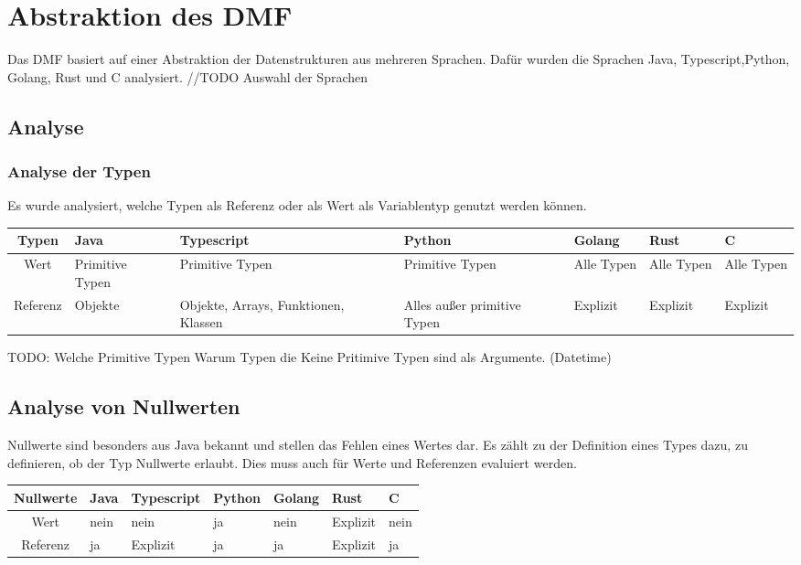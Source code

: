 \documentclass[./einleitung.tex]{subfiles}
\begin{document}
\section{Abstraktion des DMF}
Das DMF basiert auf einer Abstraktion der Datenstrukturen aus mehreren Sprachen.
Dafür wurden die Sprachen Java, Typescript,Python, Golang, Rust und C analysiert.
//TODO Auswahl der Sprachen
\subsection{Analyse}
\subsubsection{Analyse der Typen}
Es wurde analysiert, welche Typen als Referenz oder als Wert als Variablentyp genutzt werden können.
\begin{center}
\begin{tabular}{| c || m{4em} | m{5em} | m{5em} | m{4.5em} | m{4.5em} | m{4.5em} |}
\hline
Typen & Java & Typescript & Python & Golang & Rust & C \\
\hline
Wert & Primitive Typen & Primitive Typen & Primitive Typen & Alle Typen & Alle Typen & Alle Typen \\
\hline
Referenz & Objekte & Objekte, Arrays, Funktionen, Klassen & Alles außer primitive Typen & Explizit & Explizit & Explizit \\
\hline
\end{tabular}
\end{center}
TODO:
Welche Primitive Typen 
Warum Typen die Keine Pritimive Typen sind als Argumente. (Datetime)
\subsection{Analyse von Nullwerten}
Nullwerte sind besonders aus Java bekannt und stellen das Fehlen eines Wertes dar. Es zählt zu der Definition eines Types dazu, zu definieren, ob der Typ Nullwerte erlaubt.
Dies muss auch für Werte und Referenzen evaluiert werden.
\begin{center}
\begin{tabular}{| c || m{4em} | m{5em} | m{5em} | m{4.5em} | m{4.5em} | m{4.5em} |}
\hline
Nullwerte & Java & Typescript & Python & Golang & Rust & C \\
\hline
Wert & nein & nein & ja & nein & Explizit & nein \\
\hline
Referenz & ja & Explizit & ja & ja & Explizit & ja \\
\hline
\end{tabular}
\end{center}
\end{document}
